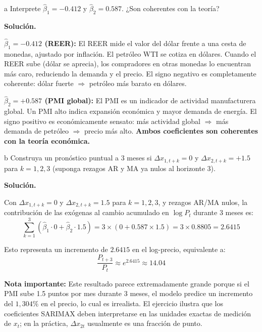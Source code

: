 \documentclass[11pt,a4paper]{article}
\begin{document}
\begin{cajaInciso}{a}
Interprete $\hat{\beta}_1=-0.412$ y $\hat{\beta}_2=0.587$. ¿Son coherentes con la teoría?
\end{cajaInciso}

\textbf{Solución.}

\textbf{$\hat{\beta}_1=-0.412$ (REER):} El REER mide el valor del dólar frente a una cesta de monedas, ajustado por inflación. El petróleo WTI se cotiza en dólares. Cuando el REER sube (dólar se aprecia), los compradores en otras monedas lo encuentran más caro, reduciendo la demanda y el precio. El signo negativo es completamente coherente: dólar fuerte $\Rightarrow$ petróleo más barato en dólares.

\textbf{$\hat{\beta}_2=+0.587$ (PMI global):} El PMI es un indicador de actividad manufacturera global. Un PMI alto indica expansión económica y mayor demanda de energía. El signo positivo es económicamente sensato: más actividad global $\Rightarrow$ más demanda de petróleo $\Rightarrow$ precio más alto. \textbf{Ambos coeficientes son coherentes con la teoría económica.}

\begin{cajaInciso}{b}
Construya un pronóstico puntual a 3 meses si $\Delta x_{1,t+k}=0$ y $\Delta x_{2,t+k}=+1.5$ para $k=1,2,3$ (suponga rezagos AR y MA ya nulos al horizonte 3).
\end{cajaInciso}

\textbf{Solución.}

Con $\Delta x_{1,t+k}=0$ y $\Delta x_{2,t+k}=1.5$ para $k=1,2,3$, y rezagos AR/MA nulos, la contribución de las exógenas al cambio acumulado en $\log P_t$ durante 3 meses es:
\[
\sum_{k=1}^{3}\left(\hat{\beta}_1\cdot 0 + \hat{\beta}_2\cdot 1.5\right) = 3\times(0+0.587\times1.5) = 3\times 0.8805 = 2.6415
\]

Esto representa un incremento de $2.6415$ en el log-precio, equivalente a:
\[
\frac{P_{t+3}}{P_t} \approx e^{2.6415} \approx 14.04
\]

\textbf{Nota importante:} Este resultado parece extremadamente grande porque si el PMI sube 1.5 puntos por mes durante 3 meses, el modelo predice un incremento del $1{,}304\%$ en el precio, lo cual es irrealista. El ejercicio ilustra que los coeficientes SARIMAX deben interpretarse en las unidades exactas de medición de $x_t$; en la práctica, $\Delta x_{2t}$ usualmente es una fracción de punto.
\end{document}

